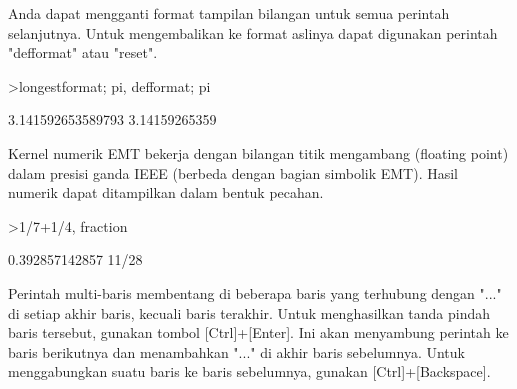 \documentclass[a4paper,10pt]{article}
\begin{document}
\begin{eulernotebook}
\begin{eulercomment}
\begin{eulercomment}
\begin{eulercomment}
\begin{eulercomment}
\begin{eulercomment}
Anda dapat mengganti format tampilan bilangan untuk semua perintah
selanjutnya. Untuk mengembalikan ke format aslinya dapat digunakan
perintah "defformat" atau "reset".
\end{eulercomment}
\begin{eulerprompt}
>longestformat; pi, defformat; pi
\end{eulerprompt}
\begin{euleroutput}
  3.141592653589793
  3.14159265359
\end{euleroutput}
\begin{eulercomment}
Kernel numerik EMT bekerja dengan bilangan titik mengambang (floating point)
dalam presisi ganda IEEE (berbeda dengan bagian simbolik EMT). Hasil numerik
dapat ditampilkan dalam bentuk pecahan.
\end{eulercomment}
\begin{eulerprompt}
>1/7+1/4, fraction %
\end{eulerprompt}
\begin{euleroutput}
  0.392857142857
  11/28
\end{euleroutput}
\begin{eulercomment}
Perintah multi-baris membentang di beberapa baris yang terhubung
dengan "..." di setiap akhir baris, kecuali baris terakhir. Untuk
menghasilkan tanda pindah baris tersebut, gunakan tombol
[Ctrl]+[Enter]. Ini akan menyambung perintah ke baris berikutnya dan
menambahkan "..." di akhir baris sebelumnya. Untuk menggabungkan suatu
baris ke baris sebelumnya, gunakan [Ctrl]+[Backspace].


\end{eulercomment}
\end{eulercomment}
\end{eulercomment}
\end{eulercomment}
\end{eulercomment}
\end{eulernotebook}
\end{document}
